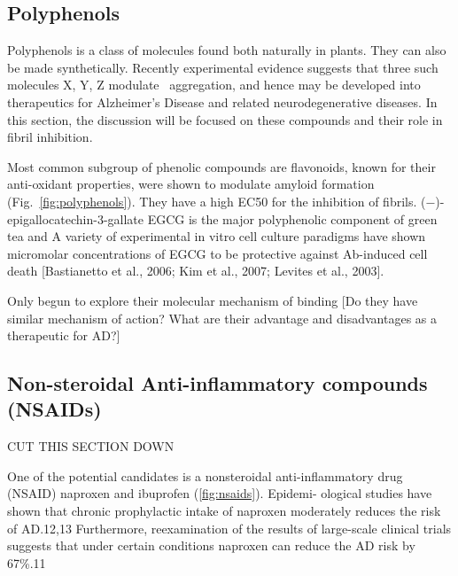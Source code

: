 \subsection{Polyphenols}
Polyphenols is a class of molecules found both naturally in plants. They can also be made synthetically. Recently experimental evidence suggests that three such molecules X, Y, Z modulate \abeta\ aggregation, and hence may be developed into therapeutics for Alzheimer's Disease and related neurodegenerative diseases.  In this section, the discussion will be focused on these compounds and their role in fibril inhibition.

Most common subgroup of phenolic compounds are flavonoids, known for their anti-oxidant properties, were shown to modulate amyloid formation (Fig.~\ref{fig:polyphenols}). They have a high EC50 for the inhibition of fibrils.   (−)-epigallocatechin-3-gallate EGCG is the major polyphenolic component of green tea and  A variety of experimental in vitro cell culture paradigms have shown micromolar concentrations of EGCG to be protective against Ab-induced cell death [Bastianetto et al., 2006; Kim et al., 2007; Levites et al., 2003].

Only begun to explore their molecular mechanism of binding [Do they have similar mechanism of action? What are their advantage and disadvantages as a therapeutic for AD?]


\subsection{Non-steroidal Anti-inflammatory compounds (NSAIDs)}

CUT THIS SECTION DOWN

One of the potential candidates is a nonsteroidal anti-inflammatory drug (NSAID) naproxen and ibuprofen (\ref{fig:nsaids}).\cite{XXX} Epidemi- ological studies have shown that chronic prophylactic intake of naproxen moderately reduces the risk of AD.12,13 Furthermore, reexamination of the results of large-scale clinical trials suggests that under certain conditions naproxen can reduce the AD risk by 67\%.11

